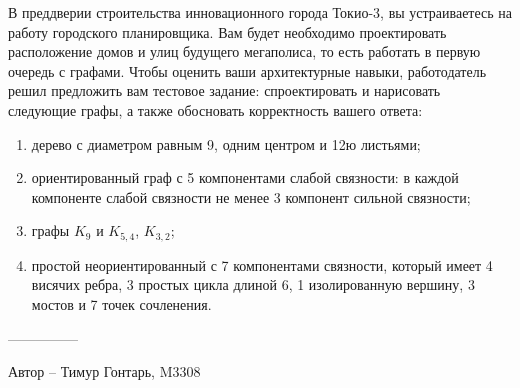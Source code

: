 \question
В преддверии строительства инновационного города Токио-3, вы устраиваетесь на работу городского планировщика. Вам будет необходимо проектировать расположение домов и улиц будущего мегаполиса, то есть работать в первую очередь с графами. Чтобы оценить ваши архитектурные навыки, работодатель решил предложить вам тестовое задание: спроектировать и нарисовать следующие графы, а также обосновать корректность вашего ответа:

\begin{enumerate}
\item  дерево с диаметром равным 9, одним центром  и  12ю листьями;
\item  ориентированный граф с 5 компонентами слабой связности: в  каждой компоненте слабой связности не менее 3 компонент сильной связности;
\item  графы $K_9$ и $K_{5,4}$, $K_{3,2}$;
\item  простой неориентированный с 7 компонентами связности, который имеет 4 висячих ребра, 3 простых цикла длиной 6, 1 изолированную вершину, 3 мостов и 7 точек сочленения.
\end{enumerate}

---------------

Автор -- Тимур Гонтарь, M3308
